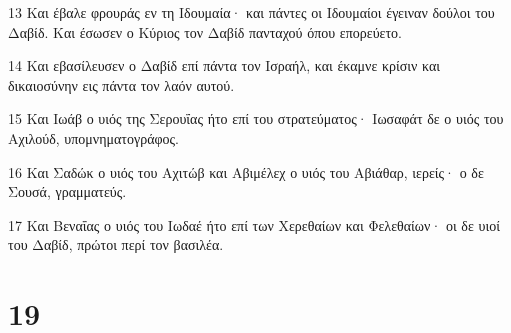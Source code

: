\par 13 Και έβαλε φρουράς εν τη Ιδουμαία· και πάντες οι Ιδουμαίοι έγειναν δούλοι του Δαβίδ. Και έσωσεν ο Κύριος τον Δαβίδ πανταχού όπου επορεύετο.
\par 14 Και εβασίλευσεν ο Δαβίδ επί πάντα τον Ισραήλ, και έκαμνε κρίσιν και δικαιοσύνην εις πάντα τον λαόν αυτού.
\par 15 Και Ιωάβ ο υιός της Σερουΐας ήτο επί του στρατεύματος· Ιωσαφάτ δε ο υιός του Αχιλούδ, υπομνηματογράφος.
\par 16 Και Σαδώκ ο υιός του Αχιτώβ και Αβιμέλεχ ο υιός του Αβιάθαρ, ιερείς· ο δε Σουσά, γραμματεύς.
\par 17 Και Βεναΐας ο υιός του Ιωδαέ ήτο επί των Χερεθαίων και Φελεθαίων· οι δε υιοί του Δαβίδ, πρώτοι περί τον βασιλέα.

\chapter{19}

